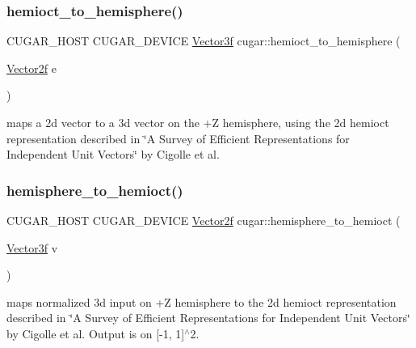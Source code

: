 \subsubsection{\texorpdfstring{hemioct\+\_\+to\+\_\+hemisphere()}{hemioct\_to\_hemisphere()}}
{\footnotesize\ttfamily C\+U\+G\+A\+R\+\_\+\+H\+O\+ST C\+U\+G\+A\+R\+\_\+\+D\+E\+V\+I\+CE \hyperlink{structcugar_1_1_vector}{Vector3f} cugar\+::hemioct\+\_\+to\+\_\+hemisphere (\begin{DoxyParamCaption}\item[{\hyperlink{structcugar_1_1_vector}{Vector2f}}]{e }\end{DoxyParamCaption})\hspace{0.3cm}{\ttfamily [inline]}}

maps a 2d vector to a 3d vector on the +Z hemisphere, using the 2d hemioct representation described in \char`\"{}\+A Survey of Efficient Representations for Independent Unit Vectors\char`\"{} by Cigolle et al. \mbox{\label{group__spherical__mappings_ga10f5d3f25177b94512dc15b59a0434bc}} 
\subsubsection{\texorpdfstring{hemisphere\+\_\+to\+\_\+hemioct()}{hemisphere\_to\_hemioct()}}
{\footnotesize\ttfamily C\+U\+G\+A\+R\+\_\+\+H\+O\+ST C\+U\+G\+A\+R\+\_\+\+D\+E\+V\+I\+CE \hyperlink{structcugar_1_1_vector}{Vector2f} cugar\+::hemisphere\+\_\+to\+\_\+hemioct (\begin{DoxyParamCaption}\item[{\hyperlink{structcugar_1_1_vector}{Vector3f}}]{v }\end{DoxyParamCaption})\hspace{0.3cm}{\ttfamily [inline]}}

maps normalized 3d input on +Z hemisphere to the 2d hemioct representation described in \char`\"{}\+A Survey of Efficient Representations for Independent Unit Vectors\char`\"{} by Cigolle et al. Output is on \mbox{[}-\/1, 1\mbox{]}$^\wedge$2. \mbox{\label{group__spherical__mappings_gad2300cdc769dfa8bb11e2b8452895545}} 
